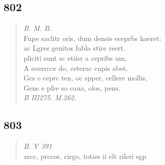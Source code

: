 \documentclass[11pt, a4paper]{report}
\begin{document}
            \subsection*{802}
      \begin{verse}
      \textit{B. M. B.} \\ Fupe saclitr oris, dum densis eceprbs haeret: \\ ac Lgres genitos fabla stire reert. \\ pliciti sunt sc etiisr a cepribs um, \\ A eoerrcce do, ceterac cnpis abet. \\ Gcs c ceprc ten, oc spper, cellere mollis, \\ Gens e pfre so caua, olos, pens. \\ \textit{B III275. M.262.} \\ 
      \end{verse}
  
            \subsection*{803}
      \begin{verse}
      \textit{B. V 391} \\ arcc, prccor, cirgo, toties ii elt rileri sgp \\ 
      \end{verse}
  
\end{document}
